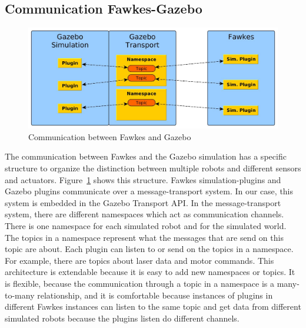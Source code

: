 \subsection{Communication Fawkes-Gazebo}
\label{sec:architecture_communication}
\begin{figure}
\center
\includegraphics[width=\textwidth]{tabs/communication}
\caption{Communication between Fawkes and Gazebo}
\label{fig:communication}
\end{figure}
The communication between Fawkes and the Gazebo simulation has a specific structure to organize the distinction between multiple robots and different sensors and actuators. Figure~\ref{fig:communication} shows this structure. Fawkes simulation-plugins and Gazebo plugins communicate over a message-transport system. In our case, this system is embedded in the Gazebo Transport API. In the message-transport system, there are different namespaces which act as communication channels. There is one namespace for each simulated robot and for the simulated world. The topics in a namespace represent what the messages that are send on this topic are about. Each plugin can listen to or send on the topics in a namespace. For example, there are topics about laser data and motor commands. This architecture is extendable because it is easy to add new namespaces or topics. It is flexible, because the communication through a topic in a namespace is a many-to-many relationship, and it is comfortable because instances of plugins in different Fawkes instances can listen to the same topic and get data from different simulated robots because the plugins listen do different channels.


